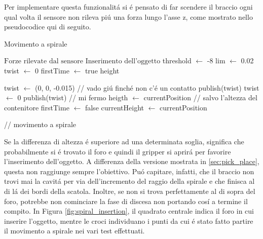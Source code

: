 Per implementare questa funzionalit\'{a} si \'{e} pensato di far scendere il braccio ogni qual volta il sensore non rileva pi\'{u}
una forza lungo l'asse z, come mostrato nello pseudocodice qui di seguito. 
\newpage
\begin{algorithm}[H]
    \caption{Movimento a spirale}\label{algo:spiral}
    \begin{algorithmic}[1]
        \Require $\text{Forze rilevate dal sensore}$
        \Ensure $\text{Inserimento dell'oggetto}$
        \State threshold $\gets$ -8
        \State lim $\gets$ 0.02
        \State twist $\gets$ 0
        \State firstTime $\gets$ true
        \State height
        
        \Repeat 
                \State twist $\gets$ (0, 0, -0.015) // vado gi\'{u} finch\'{e} non c'\'{e} un contatto
                \State publish(twist)
            \EndWhile
            \State twist $\gets$ 0
            \State publish(twist) // mi fermo
                \State heigth $\gets$ currentPosition // salvo l'altezza del contenitore
                \State firstTime $\gets$ false
            \EndIf
            \State currentHeight $\gets$ currentPosition

                // movimento a spirale
            \EndWhile
    \end{algorithmic}
    \end{algorithm}
Se la differenza di altezza \'{e} superiore ad una determinata soglia, significa che probabilmente si \'{e} 
trovato il foro e quindi il gripper si aprir\'{a} per favorire l'inserimento dell'oggetto. 
A differenza della versione mostrata in \ref{sec:pick_place}, questa non raggiunge sempre l'obiettivo. 
Pu\'{o} capitare, infatti, che il braccio non trovi mai la cavit\'{a} per via dell'incremento del raggio della spirale e che finisca 
al di l\'{a} dei bordi della scatola. Inoltre, se non si trova perfettamente al di sopra del foro, potrebbe non cominciare la 
fase di discesa non portando cos\'{i} a termine il compito. 
In Figura \ref{fig:spiral_insertion}, il quadrato centrale indica il foro in cui inserire l'oggetto, mentre le croci individuano i 
punti da cui \'{e} stato fatto partire il movimento a spirale nei vari test effettuati. 
